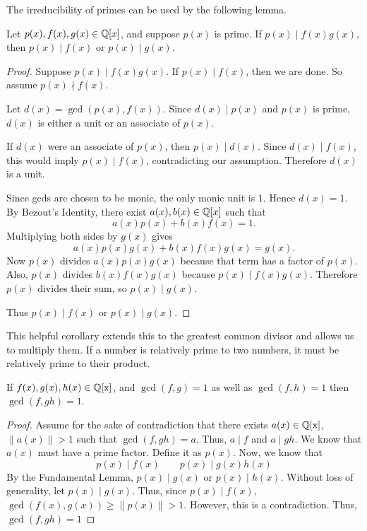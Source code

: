 The irreducibility of primes can be used by the following lemma.
\begin{lemma}
Let $p(x),f(x),g(x)\in\mathbb{Q}[x]$, and suppose $p(x)$ is prime. If $p(x)\mid f(x)g(x)$, then $p(x)\mid f(x)$ or $p(x)\mid g(x)$.
\end{lemma}

\begin{proof}
Suppose $p(x)\mid f(x)g(x)$. If $p(x)\mid f(x)$, then we are done. So assume $p(x)\nmid f(x)$.

Let $d(x)=\gcd(p(x),f(x))$. Since $d(x)\mid p(x)$ and $p(x)$ is prime, $d(x)$ is either a unit or an associate of $p(x)$.

If $d(x)$ were an associate of $p(x)$, then $p(x)\mid d(x)$. Since $d(x)\mid f(x)$, this would imply $p(x)\mid f(x)$, contradicting our assumption. Therefore $d(x)$ is a unit.

Since gcds are chosen to be monic, the only monic unit is $1$. Hence $d(x)=1$. By Bezout's Identity, there exist $a(x),b(x)\in\mathbb{Q}[x]$ such that
\[
a(x)p(x)+b(x)f(x)=1.
\]
Multiplying both sides by $g(x)$ gives
\[
a(x)p(x)g(x)+b(x)f(x)g(x)=g(x).
\]
Now $p(x)$ divides $a(x)p(x)g(x)$ because that term has a factor of $p(x)$. Also, $p(x)$ divides $b(x)f(x)g(x)$ because $p(x)\mid f(x)g(x)$. Therefore $p(x)$ divides their sum, so $p(x)\mid g(x)$.

Thus $p(x)\mid f(x)$ or $p(x)\mid g(x)$.
\end{proof}
This helpful corollary extends this to the greatest common divisor and allows us to multiply them. If a number is relatively prime to two numbers, it must be relatively prime to their product.
\begin{corollary}
    If $f(x), g(x), h(x) \in \operatorname{\mathbb{Q}[x]}$, and $\gcd(f, g) = 1$ as well as $\gcd(f, h) = 1$ then $\gcd(f, gh) = 1$.
\end{corollary}
\begin{proof}
    Assume for the sake of contradiction that there exists $a(x) \in \operatorname{\mathbb{Q}[x]}$, $\|a(x)\| > 1$ such that $\gcd(f, gh) = a$. Thus, $a \mid f$ and $a \mid gh$. We know that $a(x)$ must have a prime factor. Define it as $p(x)$. Now, we know that \[
    p(x) \mid f(x) \qquad p(x) \mid g(x)h(x)
    \]
    By the Fundamental Lemma, $p(x) \mid g(x)$ or $p(x) \mid h(x)$. Without loss of generality, let $p(x) \mid g(x)$. Thus, since $p(x) \mid f(x)$, $\gcd(f(x), g(x)) \geq \|p(x)\| > 1$. However, this is a contradiction. Thus, $\gcd(f, gh) = 1$
\end{proof}

